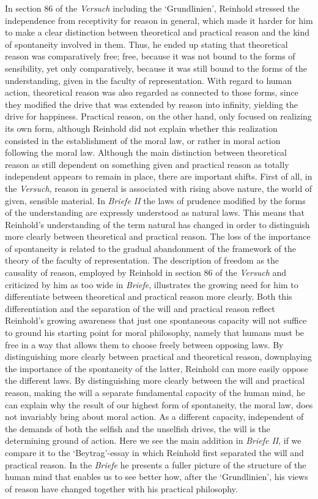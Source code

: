 In section 86 of the \textit{Versuch} including the `Grundlinien', Reinhold stressed the independence from receptivity for reason in general, which made it harder for him to make a clear distinction between theoretical and practical reason and the kind of spontaneity involved in them. Thus, he ended up stating that theoretical reason was comparatively free; free, because it was not bound to the forms of sensibility, yet only comparatively, because it was still bound to the forms of the understanding, given in the faculty of representation. With regard to human action, theoretical reason was also regarded as connected to those forms, since they modified the drive that was extended by reason into infinity, yielding the drive for happiness. Practical reason, on the other hand, only focused on realizing its own form, although Reinhold did not explain whether this realization consisted in the establishment of the moral law, or rather in moral action following the moral law. Although the main distinction between theoretical reason as still dependent on something given and practical reason as totally independent appears to remain in place, there are important shifts. First of all, in the \textit{Versuch}, reason in general is associated with rising above nature, the world of given, sensible material. In \textit{Briefe II} the laws of prudence modified by the forms of the understanding are expressly understood as natural laws. This means that Reinhold's understanding of the term natural has changed in order to distinguish more clearly between theoretical and practical reason. The loss of the importance of spontaneity is related to the gradual abandonment of the framework of the theory of the faculty of representation. The description of freedom as the causality of reason, employed by Reinhold in section 86 of the \textit{Versuch} and criticized by him as too wide in \textit{Briefe}, illustrates the growing need for him to differentiate between theoretical and practical reason more clearly. Both this differentiation and the separation of the will and practical reason reflect Reinhold's growing awareness that just one spontaneous capacity will not suffice to ground his starting point for moral philosophy, namely that humans must be free in a way that allows them to choose freely between opposing laws. By distinguishing more clearly between practical and theoretical reason, downplaying the importance of the spontaneity of the latter, Reinhold can more easily oppose the different laws. By distinguishing more clearly between the will and practical reason, making the will a separate fundamental capacity of the human mind, he can explain why the result of our highest form of spontaneity, the moral law, does not invariably bring about moral action. As a different capacity, independent of the demands of both the selfish and the unselfish drives, the will is the determining ground of action. Here we see the main addition in \textit{Briefe II}, if we compare it to the `Beytrag'{-}essay in which Reinhold first separated the will and practical reason. In the \textit{Briefe} he presents a fuller picture of the structure of the human mind that enables us to see better how, after the `Grundlinien', his views of reason have changed together with his practical philosophy. 

